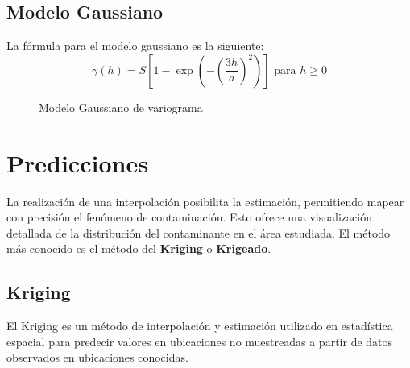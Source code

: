 \subsection{Modelo Gaussiano}

La fórmula para el modelo gaussiano es la siguiente:
\[
\gamma(h) = S \left[ 1 - \exp\left(-\left(\frac{3h}{a}\right)^2\right) \right] \text{ para } h \geq 0
\]

\begin{figure}[h!]
\centering
{}
\caption{Modelo Gaussiano de variograma}
\end{figure}

\section{Predicciones}


La realización de una interpolación posibilita la estimación, permitiendo mapear con precisión el fenómeno de contaminación. Esto ofrece una visualización detallada de la distribución del contaminante en el área estudiada. El método más conocido es el método del \textbf{Kriging} o \textbf{Krigeado}.

\subsection{Kriging}

El Kriging es un método de interpolación y estimación utilizado en estadística espacial para predecir valores en ubicaciones no muestreadas a partir de datos observados en ubicaciones conocidas.

